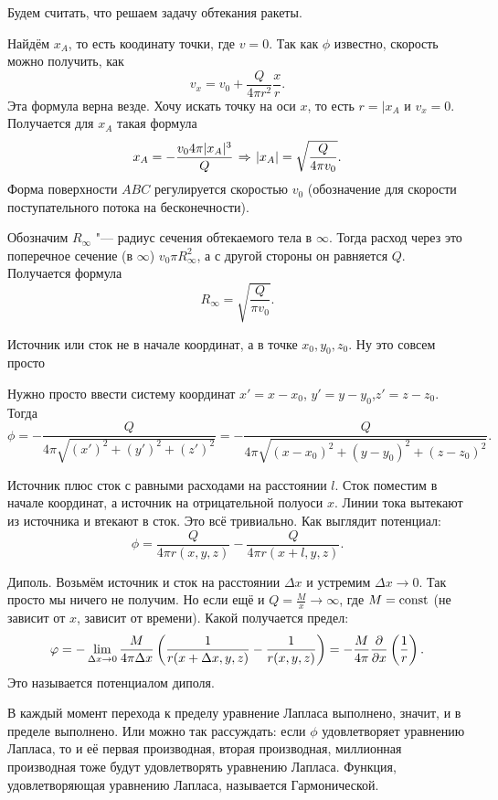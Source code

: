 Будем считать, что решаем задачу обтекания ракеты.

Найдём $x_A$, то есть коодинату точки, где $v=0$. Так как $\phi$ известно, скорость можно получить, как
\[
  v_x = v_0 + \frac Q{4\pi r^2}\frac xr.
\]
Эта формула верна везде. Хочу искать точку на оси $x$, то есть $r = |x_A$ и $v_x = 0$. Получается для $x_A$ такая формула
\[
  x_A = -\frac{v_04\pi |x_A|^3}Q\imp |x_A| = \sqrt{\frac Q{4\pi v_0}}.
\]
Форма поверхности $ABC$ регулируется скоростью $v_0$ (обозначение для скорости поступательного потока на бесконечности).

Обозначим $R_\infty$ "--- радиус сечения обтекаемого тела в $\infty$.
Тогда расход через это поперечное сечение (в $\infty$) $v_0\pi R_\infty^2$, а с другой стороны он равняется $Q$. Получается формула
\[
  R_\infty = \sqrt{\frac Q{\pi v_0}}.
\]

\begin{Exa}
  Источник или сток не в начале координат, а в точке $x_0,y_0,z_0$. Ну это совсем просто

Нужно просто ввести систему координат $x' = x-x_0$, $y' = y-y_0$,$z' = z-z_0$. Тогда
\[
  \phi = -\frac Q{4\pi\sqrt{(x')^2 + (y')^2+(z')^2}} = -\frac Q{4\pi\sqrt{(x-x_0)^2 + (y-y_0)^2+(z-z_0)^2}}.
\]
\end{Exa}

\begin{Exa}
  Источник плюс сток с равными расходами на расстоянии $l$. 
 Сток поместим в начале координат, а источник на отрицательной полуоси $x$. Линии тока вытекают из источника и втекают в сток. Это всё тривиально. Как выглядит потенциал:
\[
  \phi = \frac Q{4\pi r(x,y,z)} - \frac Q{4\pi r(x+l,y,z)}.
\]
\end{Exa}

\begin{Exa} Диполь. Возьмём источник и сток на расстоянии $\Delta x$ и устремим $\Delta x\to 0$. Так просто мы ничего не получим. Но если ещё и $Q = \frac{M}x \to \infty$, где $M=\operatorname{const}$ (не зависит от $x$, зависит от времени).
Какой получается предел:
\[
  \varphi = - \lim\limits_{\Delta x\rightarrow0}\frac M{4\pi \Delta x}\left(
    \frac1{r(x+\Delta x,y,z)} - \frac1{r(x,y,z)}
  \right) = - \frac M{4\pi}\frac{\partial }{\partial x}\left(\frac1r\right).
\]
Это называется потенциалом диполя.
\end{Exa}
В каждый момент перехода к пределу уравнение Лапласа выполнено, значит, и в пределе выполнено. Или можно так рассуждать: если $\phi$ удовлетворяет уравнению Лапласа, то и её первая производная, вторая производная, миллионная производная тоже будут удовлетворять уравнению Лапласа. Функция, удовлетворяющая уравнению Лапласа, называется Гармонической.


